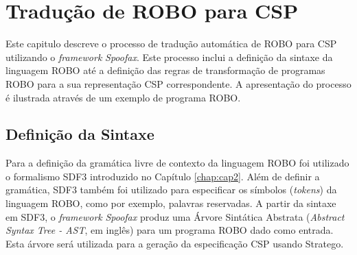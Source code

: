 \chapter{Tradução de ROBO para CSP}
\label{chap:cap3}

Este capitulo descreve o processo de tradução automática de ROBO para CSP utilizando o \textit{framework} \textit{Spoofax}. Este processo inclui a definição da sintaxe da linguagem ROBO até a definição das regras de transformação de programas ROBO para a sua representação  CSP correspondente. A apresentação do processo é ilustrada através de um exemplo de programa ROBO.


\section{Definição da Sintaxe}
Para a definição da gramática livre de contexto da linguagem ROBO foi utilizado o formalismo SDF3 introduzido no Capítulo \ref{chap:cap2}. Além de definir a gramática, SDF3 também foi utilizado para especificar os símbolos (\textit{tokens}) da linguagem ROBO, como por exemplo, palavras reservadas. A partir da sintaxe em SDF3, o \textit{framework} \textit{Spoofax} produz uma Árvore Sintática Abstrata (\textit{Abstract Syntax Tree - AST}, em inglês) para um programa ROBO dado como entrada. Esta árvore será utilizada para a geração da especificação CSP usando Stratego.

